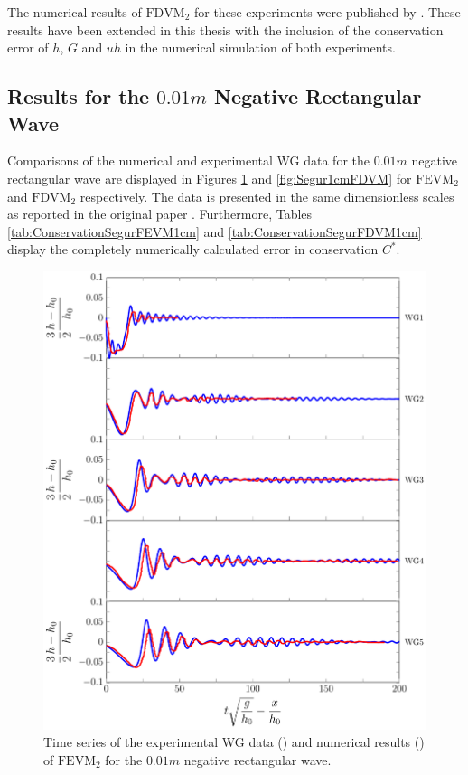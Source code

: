 The numerical results of $\text{FDVM}_2$ for these experiments were published by \citet{Zoppou-etal-2017}. These results have been extended in this thesis with the inclusion of the conservation error of $h$, $G$ and $uh$ in the numerical simulation of both experiments.

\subsection{Results for the $0.01m$ Negative Rectangular Wave}
Comparisons of the numerical and experimental WG data for the $0.01m$ negative rectangular wave are displayed in Figures \ref{fig:Segur1cmFEVM} and \ref{fig:Segur1cmFDVM} for $\text{FEVM}_2$ and $\text{FDVM}_2$ respectively. The data is presented in the same dimensionless scales as reported in the original paper \cite{Hammack-Segur-1978-337}. Furthermore, Tables \ref{tab:ConservationSegurFEVM1cm} and \ref{tab:ConservationSegurFDVM1cm} display the completely numerically calculated error in conservation $C^*$. 
\begin{figure}
	\centering
	\includegraphics[width=\textwidth]{./chp6/figures/Experiment/Segur/LongWGsFEVM1cm.pdf}
	\caption{Time series of the experimental WG data ({\color{red}\solidrule}) and numerical results ({\color{blue}\solidrule}) of $\text{FEVM}_2$ for the $0.01m$ negative rectangular wave.}
	\label{fig:Segur1cmFEVM}
\end{figure}
